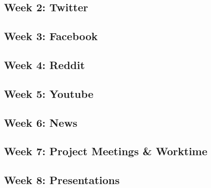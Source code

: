 \documentclass[11pt,]{article}
\begin{document}
\hypertarget{week-2-twitter}{%
\subsection{Week 2: Twitter}\label{week-2-twitter}}

\hypertarget{week-3-facebook}{%
\subsection{Week 3: Facebook}\label{week-3-facebook}}

\hypertarget{week-4-reddit}{%
\subsection{Week 4: Reddit}\label{week-4-reddit}}

\hypertarget{week-5-youtube}{%
\subsection{Week 5: Youtube}\label{week-5-youtube}}

\hypertarget{week-6-news}{%
\subsection{Week 6: News}\label{week-6-news}}

\hypertarget{week-7-project-meetings-worktime}{%
\subsection{Week 7: Project Meetings \&
Worktime}\label{week-7-project-meetings-worktime}}

\hypertarget{week-8-presentations}{%
\subsection{Week 8: Presentations}\label{week-8-presentations}}
\end{document}
